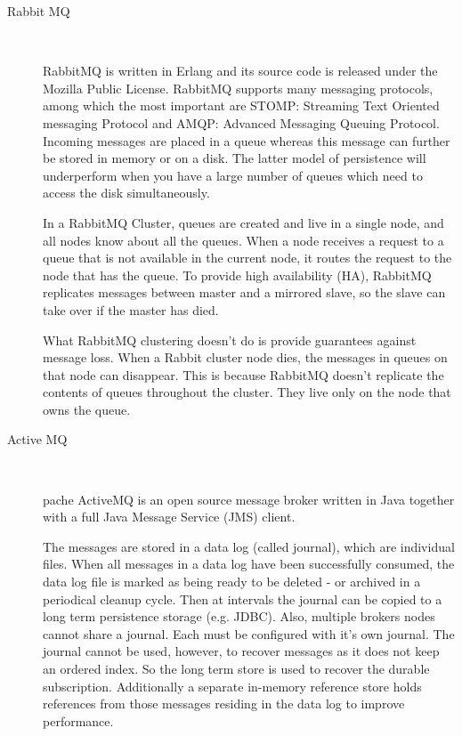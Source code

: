 \begin{description}
    \item [Rabbit MQ] \hfill \\
    {
    RabbitMQ is written in Erlang and its source code is released under the
    Mozilla Public License. RabbitMQ supports many messaging protocols, among
    which the most important are STOMP: Streaming Text Oriented messaging
    Protocol and AMQP: Advanced Messaging Queuing Protocol. Incoming messages
    are placed in a queue whereas this message can further be stored in memory
    or on a disk. The latter model of persistence will underperform when you
    have a large number of queues which need to access the disk simultaneously.
    \cite{rabbitmq}

    In a RabbitMQ Cluster, queues are created and live in a single node, and all
    nodes know about all the queues. When a node receives a request to a queue
    that is not available in the current node, it routes the request to the node
    that has the queue. To provide high availability (HA), RabbitMQ replicates
    messages between master and a mirrored slave, so the slave can take over if the
    master has died. \cite{wickramarachchi2012andes}

    What RabbitMQ clustering doesn't do is provide guarantees against message loss.
    When a Rabbit cluster node dies, the messages in queues on that
    node can disappear. This is because RabbitMQ doesn't replicate the contents
    of queues throughout the cluster. They live only on the node that owns the
    queue. \cite{videla2012rabbitmq}
    }
    \item [Active MQ] \hfill \\
    {
    pache ActiveMQ is an open source message broker written in Java
    together with a full Java Message Service (JMS) client. 

    The messages are stored in a data log (called journal), which are individual
    files. When all messages in a data log have been successfully consumed, the
    data log file is marked as being ready to be deleted - or archived in a
    periodical cleanup cycle. Then at intervals the journal can be copied to a
    long term persistence storage (e.g. JDBC). Also, multiple brokers nodes
    cannot share a journal. Each must be configured with it's own journal. The
    journal cannot be used, however, to recover messages as it does not keep an
    ordered index. So the long term store is used to recover the durable
    subscription. Additionally a separate in-memory reference store holds
    references from those messages residing in the data log to improve
    performance.

}
\end{description}
